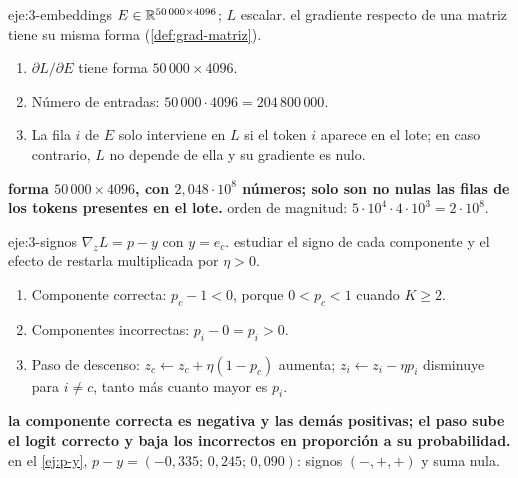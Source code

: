 \begin{solucion}{eje:3-embeddings}
\datos $E\in\mathbb{R}^{50\,000\times 4096}$; $L$ escalar.
\planteamiento el gradiente respecto de una matriz tiene su misma forma (\cref{def:grad-matriz}).
\pasos
\begin{enumerate}[label=\arabic*.]
  \item $\partial L/\partial E$ tiene forma $50\,000\times 4096$.
  \item Número de entradas: $50\,000\cdot 4096=204\,800\,000$.
  \item La fila $i$ de $E$ solo interviene en $L$ si el token $i$ aparece en el lote; en caso contrario, $L$ no depende de ella y su gradiente es nulo.
\end{enumerate}
\resultado \textbf{forma $50\,000\times 4096$, con $2{,}048\cdot 10^{8}$ números; solo son no nulas las filas de los tokens presentes en el lote.}
\comprobacion orden de magnitud: $5\cdot 10^{4}\cdot 4\cdot 10^{3}=2\cdot 10^{8}$.
\end{solucion}

\begin{solucion}{eje:3-signos}
\datos $\nabla_zL=p-y$ con $y=e_c$.
\planteamiento estudiar el signo de cada componente y el efecto de restarla multiplicada por $\eta>0$.
\pasos
\begin{enumerate}[label=\arabic*.]
  \item Componente correcta: $p_c-1<0$, porque $0<p_c<1$ cuando $K\ge 2$.
  \item Componentes incorrectas: $p_i-0=p_i>0$.
  \item Paso de descenso: $z_c\leftarrow z_c+\eta(1-p_c)$ aumenta; $z_i\leftarrow z_i-\eta p_i$ disminuye para $i\ne c$, tanto más cuanto mayor es $p_i$.
\end{enumerate}
\resultado \textbf{la componente correcta es negativa y las demás positivas; el paso sube el logit correcto y baja los incorrectos en proporción a su probabilidad.}
\comprobacion en el \cref{ej:p-y}, $p-y=(-0{,}335;\,0{,}245;\,0{,}090)$: signos $(-,+,+)$ y suma nula.
\end{solucion}

